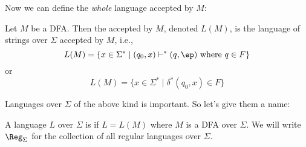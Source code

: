 Now we can define the \textit{whole} language accepted by $M$:

\begin{defn} Let $M$ be a DFA. Then the  accepted by $M$,
denoted $L(M)$, is the language of strings over $\Sigma$ accepted
by $M$, i.e.,
\[
L(M) = \{x \in \Sigma^* \mid (q_0, x) \vdash^* (q, \ep) \text{ where } q \in F \}
\]
or
\[
L(M) = \{x \in \Sigma^* \mid \delta^* (q_0, x) \in F \}
\]
\end{defn}





\newpage
Languages over $\Sigma$ of the above kind is important.
So let's give them a name: 

\begin{defn}
A language $L$ over $\Sigma$
is  if $L = L(M)$ where $M$ is a DFA over $\Sigma$.
We will write $\Reg_\Sigma$ for the collection of all 
regular languages over $\Sigma$.
\end{defn}


